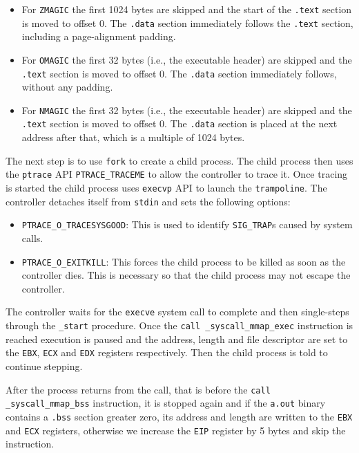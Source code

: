 \documentclass[draft,final]{vutinfth} %
\begin{document}
\begin{itemize}
    \item For \texttt{ZMAGIC} the first 1024 bytes are skipped and the start of the \texttt{.text} section is moved to offset 0. The \texttt{.data} section immediately follows the \texttt{.text} section, including a page-alignment padding.
    
    \item For \texttt{OMAGIC} the first 32 bytes (i.e., the executable header) are skipped and the \texttt{.text} section is moved to offset 0. The \texttt{.data} section immediately follows, without any padding.
    
    \item For \texttt{NMAGIC} the first 32 bytes (i.e., the executable header) are skipped and the \texttt{.text} section is moved to offset 0. The \texttt{.data} section is placed at the next address after that, which is a multiple of 1024 bytes.
\end{itemize}

The next step is to use \texttt{fork} to create a child process. The child process then uses the \texttt{ptrace} API \texttt{PTRACE\_TRACEME} to allow the controller to trace it. Once tracing is started the child process uses \texttt{execvp} API to launch the \texttt{trampoline}. The controller detaches itself from \texttt{stdin} and sets the following options:

\begin{itemize}
    \item \texttt{PTRACE\_O\_TRACESYSGOOD}: This is used to identify \texttt{SIG\_TRAP}s caused by system calls.
    \item \texttt{PTRACE\_O\_EXITKILL}: This forces the child process to be killed as soon as the controller dies. This is necessary so that the child process may not escape the controller.
\end{itemize}

The controller waits for the \texttt{execve} system call to complete and then single-steps through the \texttt{\_start} procedure. Once the \texttt{call \_syscall\_mmap\_exec} instruction is reached execution is paused and the address, length and file descriptor are set to the \texttt{EBX}, \texttt{ECX} and \texttt{EDX} registers respectively. Then the child process is told to continue stepping.

After the process returns from the call, that is before the \texttt{call \_syscall\_mmap\_bss} instruction, it is stopped again and if the \texttt{a.out} binary contains a \texttt{.bss} section greater zero, its address and length are written to the \texttt{EBX} and \texttt{ECX} registers, otherwise we increase the \texttt{EIP} register by 5 bytes and skip the instruction.
\end{document}
